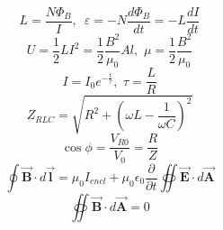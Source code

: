 \documentclass[12pt,landscape]{article}
\begin{document}
\begin{multicols}{4}
    \begin{equation*}
        L = \frac{N \Phi_B}{I},\,\,\, \varepsilon = -N \frac{d\Phi_B}{dt} = -L \frac{dI}{dt}
    \end{equation*}
    \begin{equation*}
        U = \frac{1}{2} L I^2 = \frac{1}{2} \frac{B^2}{\mu_0} A l,\,\, \mu = \frac{1}{2} \frac{B^2}{\mu_0}
    \end{equation*}
    \begin{equation*}
        I = I_0 e^{-\frac{t}{\tau}},\,\, \tau = \frac{L}{R}
    \end{equation*}
    \begin{equation*}
        Z_{RLC} = \sqrt{R^2 + \left(\omega L - \frac{1}{\omega C}\right)^2}
    \end{equation*}
    \begin{equation*}
        \cos \phi = \frac{V_{R0}}{V_0} = \frac{R}{Z}
    \end{equation*}
    \begin{equation*}
        \oint \vec{\mathbf{B}} \cdot d \vec{\boldsymbol{l}} = \mu_0 I_{encl} + \mu_0 \epsilon_0 \frac{\partial}{\partial t} \oiint \vec{\mathbf{E}} \cdot d\vec{\mathbf{A}}
    \end{equation*}
    \begin{equation*}
        \oiint \vec{\mathbf{B}} \cdot d \vec{\mathbf{A}} = 0
    \end{equation*}

\end{multicols}
\end{document}
